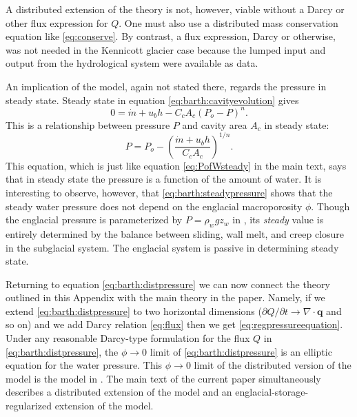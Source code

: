 \documentclass[11pt,final]{amsart}
\newcommand\bq{\mathbf{q}}
\newcommand{\Div}{\nabla\cdot}
\begin{document}
A distributed extension of the \cite{Bartholomausetal2011} theory is not, however, viable without a Darcy or other flux expression for $Q$.  One must also use a distributed mass conservation equation like \eqref{eq:conserve}.  By contrast, a flux expression, Darcy or otherwise, was not needed in the Kennicott glacier case because the lumped input and output from the hydrological system were available as data.

An implication of the \cite{Bartholomausetal2011} model, again not stated there, regards the pressure in steady state.  Steady state in equation \eqref{eq:barth:cavityevolution} gives
\begin{equation*}
0 = \dot m + u_b h - C_c A_c (P_o-P)^n.
\end{equation*}
This is a relationship between pressure $P$ and cavity area $A_c$ in steady state:
\begin{equation}
P = P_o - \left(\frac{\dot m + u_b h}{C_c A_c}\right)^{1/n}. \label{eq:barth:steadypressure}
\end{equation}
This equation, which is just like equation \eqref{eq:PofWsteady} in the main text, says that in steady state the pressure is a function of the amount of water.  It is interesting to observe, however, that \eqref{eq:barth:steadypressure} shows that the steady water pressure does not depend on the englacial macroporosity $\phi$.  Though the englacial pressure is parameterized by $P=\rho_w g z_w$ in \cite{Bartholomausetal2011}, its \emph{steady} value is entirely determined by the balance between sliding, wall melt, and creep closure in the subglacial system.  The englacial system is passive in determining steady state.

Returning to equation \eqref{eq:barth:distpressure} we can now connect the theory outlined in this Appendix with the main theory in the paper.  Namely, if we extend \eqref{eq:barth:distpressure} to two horizontal dimensions ($\partial Q/\partial t \to \Div \bq$ and so on) and we add Darcy relation \eqref{eq:flux} then we get \eqref{eq:regpressureequation}.  Under any reasonable Darcy-type formulation for the flux $Q$ in \eqref{eq:barth:distpressure}, the $\phi\to 0$ limit of \eqref{eq:barth:distpressure} is an elliptic equation for the water pressure.  This $\phi\to 0$ limit of the distributed version of the \cite{Bartholomausetal2011} model is the model in \cite{Schoofetal2012}.  The main text of the current paper simultaneously describes a distributed extension of the \cite{Bartholomausetal2011} model and an englacial-storage-regularized extension of the \cite{Schoofetal2012} model.
\end{document}
